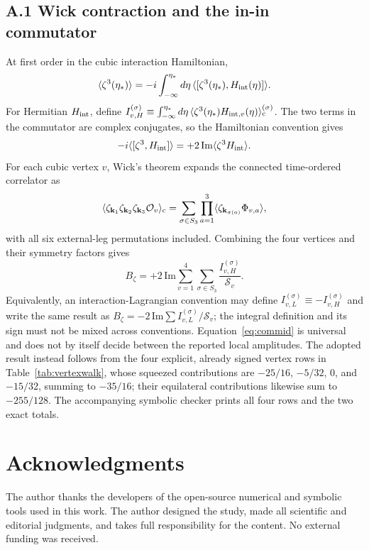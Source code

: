 \documentclass[aps,prd,twocolumn,superscriptaddress,showpacs,preprintnumbers,nofootinbib,longbibliography,floatfix]{revtex4-2}
\begin{document}
\subsection*{A.1 Wick contraction and the in-in commutator}
\label{app:wick}

At first order in the cubic interaction Hamiltonian,
\begin{equation}
\langle\zeta^3(\eta_*)\rangle=-i\int_{-\infty}^{\eta_*}d\eta\,
\langle[\zeta^3(\eta_*),H_{\rm int}(\eta)]\rangle .
\label{eq:inin}
\end{equation}
For Hermitian $H_{\rm int}$, define
$I_{v,H}^{(\sigma)}\equiv\int_{-\infty}^{\eta_*}d\eta\,
\langle\zeta^3(\eta_*)H_{{\rm int},v}(\eta)\rangle_{\rm c}^{(\sigma)}$.
The two terms in the commutator are complex conjugates, so the Hamiltonian
convention gives
\begin{equation}
-i\langle[\zeta^3,H_{\rm int}]\rangle
=+2\,\mathrm{Im}\langle\zeta^3H_{\rm int}\rangle .
\label{eq:commid}
\end{equation}
For each cubic vertex $v$, Wick's theorem expands the connected time-ordered correlator as
\begin{equation}
\langle\zeta_{\mathbf{k}_1}\zeta_{\mathbf{k}_2}\zeta_{\mathbf{k}_3}\mathcal O_v\rangle_{\rm c}
=\sum_{\sigma\in S_3}\prod_{a=1}^{3}
\langle\zeta_{\mathbf{k}_{\sigma(a)}}\Phi_{v,a}\rangle ,
\label{eq:wick}
\end{equation}
with all six external-leg permutations included. Combining the four vertices and their symmetry factors gives
\begin{equation}
B_\zeta=+2\,\mathrm{Im}\sum_{v=1}^{4}\sum_{\sigma\in S_3}
\frac{I_{v,H}^{(\sigma)}}{\mathcal S_v} .
\label{eq:Bfull}
\end{equation}
Equivalently, an interaction-Lagrangian convention may define
$I_{v,L}^{(\sigma)}\equiv-I_{v,H}^{(\sigma)}$ and write the same result as
$B_\zeta=-2\,\mathrm{Im}\sum I_{v,L}^{(\sigma)}/\mathcal S_v$; the integral
definition and its sign must not be mixed across conventions. Equation~\eqref{eq:commid}
is universal and does not by itself decide between the reported local amplitudes.
The adopted result instead follows from the four explicit, already signed vertex rows in
Table~\ref{tab:vertexwalk}, whose squeezed contributions are $-25/16$, $-5/32$, $0$,
and $-15/32$, summing to $-35/16$; their equilateral contributions likewise sum to
$-255/128$. The accompanying symbolic checker prints all four rows and the two exact totals.

\section*{Acknowledgments}

The author thanks the developers of the open-source numerical and symbolic tools used in this work. The author designed the study, made all scientific and editorial judgments, and takes full responsibility for the content. No external funding was received.


\end{document}
